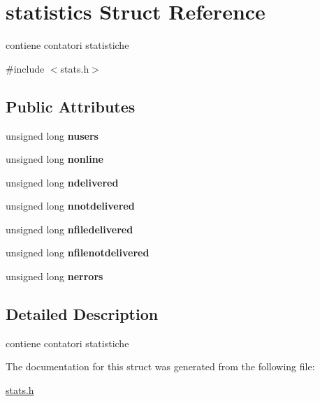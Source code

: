 \hypertarget{structstatistics}{}\section{statistics Struct Reference}
\label{structstatistics}


contiene contatori statistiche  




{\ttfamily \#include $<$stats.\+h$>$}

\subsection*{Public Attributes}
\begin{DoxyCompactItemize}
\item 
unsigned long {\bfseries nusers}\hypertarget{structstatistics_a390a45ca74cf019667fcf33848a33d13}{}\label{structstatistics_a390a45ca74cf019667fcf33848a33d13}

\item 
unsigned long {\bfseries nonline}\hypertarget{structstatistics_afe88b6c92f8cc91e152216167f2b6046}{}\label{structstatistics_afe88b6c92f8cc91e152216167f2b6046}

\item 
unsigned long {\bfseries ndelivered}\hypertarget{structstatistics_ac09e24f0d5aa3c8255f734ff040f998e}{}\label{structstatistics_ac09e24f0d5aa3c8255f734ff040f998e}

\item 
unsigned long {\bfseries nnotdelivered}\hypertarget{structstatistics_a7d8cbe9fc73479a941714316b48ffd48}{}\label{structstatistics_a7d8cbe9fc73479a941714316b48ffd48}

\item 
unsigned long {\bfseries nfiledelivered}\hypertarget{structstatistics_a87279336813cee36c18e6299606b1dd8}{}\label{structstatistics_a87279336813cee36c18e6299606b1dd8}

\item 
unsigned long {\bfseries nfilenotdelivered}\hypertarget{structstatistics_a82667eb0d0b1a45917193e9e1d6d463a}{}\label{structstatistics_a82667eb0d0b1a45917193e9e1d6d463a}

\item 
unsigned long {\bfseries nerrors}\hypertarget{structstatistics_a893b0a0d9f1fe9a6b9cf61d1f020f265}{}\label{structstatistics_a893b0a0d9f1fe9a6b9cf61d1f020f265}

\end{DoxyCompactItemize}


\subsection{Detailed Description}
contiene contatori statistiche 

The documentation for this struct was generated from the following file\+:\begin{DoxyCompactItemize}
\item 
\hyperlink{stats_8h}{stats.\+h}\end{DoxyCompactItemize}
